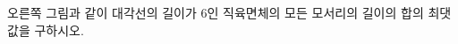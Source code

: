 \noindent\begin{minipage}[t]{0.58\linewidth}\vspace{0pt}\raggedright 오른쪽 그림과 같이 대각선의 길이가 $6$인 직육면체의 모든 모서리의 길이의 합의 최댓값을 구하시오.\end{minipage}\hfill\begin{minipage}[t]{0.4\linewidth}\vspace{0pt}\centering \resizebox{\ifdim\width>\linewidth\linewidth\else\width\fi}{!}{}\end{minipage}\par

